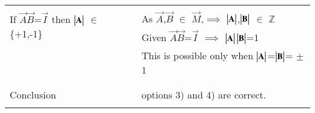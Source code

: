 \documentclass[journal,12pt,twocolumn]{IEEEtran}
\begin{document}
\begin{longtable}{|l|l|}
	& \\
	\hline
	\multirow{3}{*}{If $\vec{A} \vec{B}$=$\vec{I}$ then $\begin{vmatrix}\mathbf{A}\end{vmatrix}$ $\in$ \{+1,-1\}} 
	& \\
	& As $\vec{A}$,$\vec{B}$ $\in$ $\vec{M}$,$\implies$ $\begin{vmatrix}\mathbf{A}\end{vmatrix}$,$\begin{vmatrix}\mathbf{B}\end{vmatrix}$ $\in$ $\mathbb{Z}$ \\
	& Given $\vec{A}\vec{B}$=$\vec{I}$ $\implies$ $\begin{vmatrix}\mathbf{A}\end{vmatrix}\begin{vmatrix}\mathbf{B}\end{vmatrix}$=1\\
	& This is possible only when $\begin{vmatrix}\mathbf{A}\end{vmatrix}$=$\begin{vmatrix}\mathbf{B}\end{vmatrix}$= $\pm$ 1\\
	& \\
	\hline
	\multirow{3}{*}{Conclusion} & \\
	& options 3) and 4) are correct.\\
    & \\
    \hline
\end{longtable}
\end{document}
